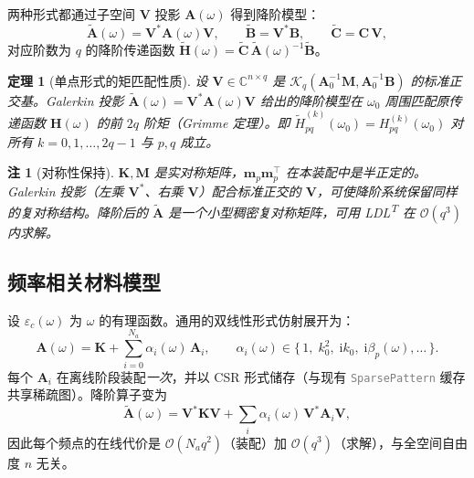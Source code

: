 \documentclass[11pt,a4paper]{ctexart}
\newcommand{\C}{\mathbb{C}}
\newcommand{\im}{\mathrm{i}}
\newtheorem{theorem}{定理}
\newtheorem{remark}{注}
\begin{document}
两种形式都通过子空间 $\bm V$ 投影 $\bm A(\omega)$ 得到降阶模型：
\begin{equation}
  \widetilde{\bm A}(\omega) = \bm V^{\!*}\bm A(\omega)\bm V,\qquad
  \widetilde{\bm B} = \bm V^{\!*}\bm B,\qquad
  \widetilde{\bm C} = \bm C\,\bm V,
\end{equation}
对应阶数为 $q$ 的降阶传递函数 $\widetilde{\bm H}(\omega) = \widetilde{\bm C}\,\widetilde{\bm A}(\omega)^{-1}\widetilde{\bm B}$。

\begin{theorem}[单点形式的矩匹配性质]
设 $\bm V\in\C^{n\times q}$ 是 $\mathcal{K}_q(\bm A_0^{-1}\bm M,\bm A_0^{-1}\bm B)$ 的标准正交基。Galerkin 投影 $\widetilde{\bm A}(\omega) = \bm V^{\!*}\bm A(\omega)\bm V$ 给出的降阶模型在 $\omega_0$ 周围匹配原传递函数 $\bm H(\omega)$ 的前 $2q$ 阶矩（Grimme 定理）。即
\(
  \tilde H_{pq}^{(k)}(\omega_0) = H_{pq}^{(k)}(\omega_0)
\)
对所有 $k=0,1,\dots,2q-1$ 与 $p,q$ 成立。
\end{theorem}

\begin{remark}[对称性保持]
$\bm K,\bm M$ 是实对称矩阵，$\bm m_p\bm m_p^{\!\top}$ 在本装配中是半正定的。Galerkin 投影（左乘 $\bm V^{\!*}$、右乘 $\bm V$）配合标准正交的 $\bm V$，可使降阶系统保留同样的复对称结构。降阶后的 $\widetilde{\bm A}$ 是一个小型稠密复对称矩阵，可用 LDL\textsuperscript{T} 在 $\mathcal{O}(q^3)$ 内求解。
\end{remark}

\subsection{频率相关材料模型}\label{sec:dispersion}

设 $\varepsilon_c(\omega)$ 为 $\omega$ 的有理函数。通用的双线性形式仿射展开为：
\begin{equation}
  \bm A(\omega) = \bm K + \sum_{i=0}^{N_a} \alpha_i(\omega)\,\bm A_i,\qquad
  \alpha_i(\omega)\in\{\,1,\;k_0^2,\;\im k_0,\;\im\beta_p(\omega),\ldots\,\}.
\end{equation}
每个 $\bm A_i$ 在离线阶段装配\emph{一次}，并以 CSR 形式储存（与现有 \textcolor{gray}{\texttt{SparsePattern}} 缓存共享稀疏图）。降阶算子变为
\begin{equation}
  \widetilde{\bm A}(\omega) = \bm V^{\!*}\bm K\bm V + \sum_i \alpha_i(\omega)\,
                              \bm V^{\!*}\bm A_i\bm V,
\end{equation}
因此每个频点的在线代价是 $\mathcal{O}(N_a q^2)$（装配）加 $\mathcal{O}(q^3)$（求解），与全空间自由度 $n$ 无关。
\end{document}
